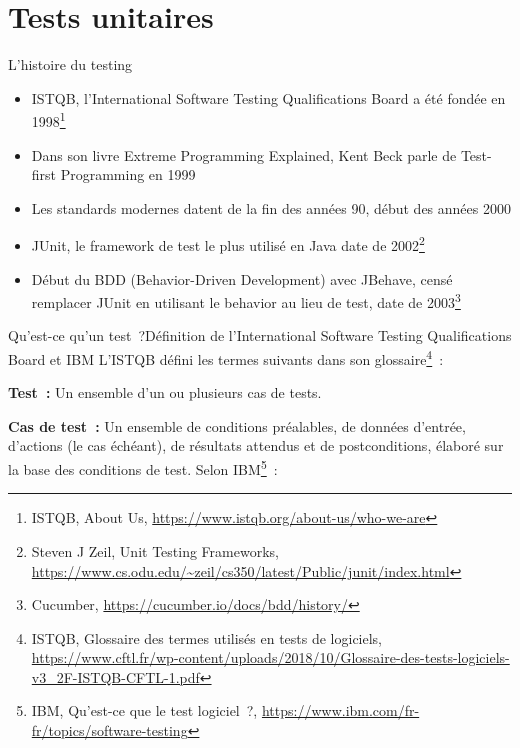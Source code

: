 \documentclass{beamer}
\begin{document}
    \section{Tests unitaires}\label{sec:tests-unitaires}

    \begin{frame}{L'histoire du testing}

        \begin{itemize}

            \item ISTQB, l'International Software Testing Qualifications Board a été fondée en 1998\footnote{ISTQB, About Us, \url{https://www.istqb.org/about-us/who-we-are}}
            \item Dans son livre Extreme Programming Explained, Kent Beck parle de Test-first Programming en 1999
            \item Les standards modernes datent de la fin des années 90, début des années 2000
            \item JUnit, le framework de test le plus utilisé en Java date de 2002\footnote{Steven J Zeil, Unit Testing Frameworks, \url{https://www.cs.odu.edu/~zeil/cs350/latest/Public/junit/index.html}}
            \item Début du BDD (Behavior-Driven Development) avec JBehave, censé remplacer JUnit en utilisant le behavior au lieu de test, date de 2003\footnote{Cucumber, \url{https://cucumber.io/docs/bdd/history/}}
        \end{itemize}

    \end{frame}

    \begin{frame}{Qu’est-ce qu’un test~?}{Définition de l'International Software Testing Qualifications Board et IBM}
        \transdissolve
        L’ISTQB défini les termes suivants dans son glossaire\footnote{ISTQB, Glossaire des termes utilisés en tests de logiciels, \url{https://www.cftl.fr/wp-content/uploads/2018/10/Glossaire-des-tests-logiciels-v3_2F-ISTQB-CFTL-1.pdf}}~:

        \textbf{Test~:} Un ensemble d’un ou plusieurs cas
        de tests.

        \textbf{Cas de test~:} Un ensemble de conditions
        préalables, de données d'entrée, d'actions
        (le cas échéant), de résultats attendus et
        de postconditions, élaboré sur la base des
        conditions de test.
        \bigbreak
        Selon IBM\footnote{IBM, Qu'est-ce que le test logiciel~?, \url{https://www.ibm.com/fr-fr/topics/software-testing}}~:

    \end{frame}
\end{document}
